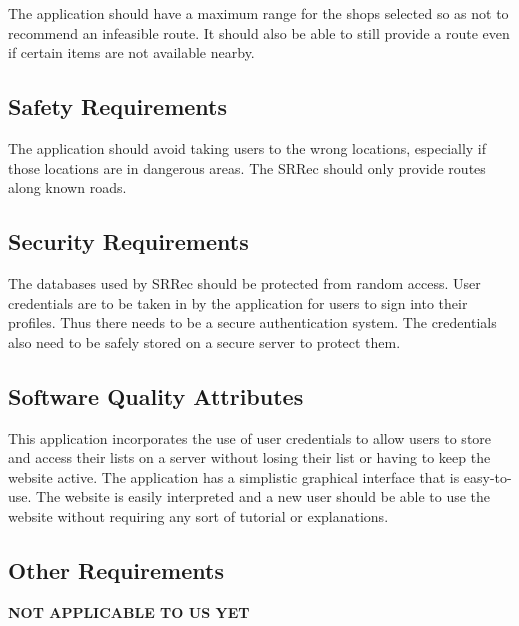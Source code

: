 \documentclass[10pt, a4paper, twocolumn]{scrartcl}
\begin{document}
			The application should have a maximum range for the shops selected so as not to recommend an infeasible route. It should also be able to still provide a route even if certain items are not available nearby.
	
		\subsection{Safety Requirements}
	
			The application should avoid taking users to the wrong locations, especially if those locations are in dangerous areas. The SRRec should only provide routes along known roads.
	
		\subsection{Security Requirements}
	
			The databases used by SRRec should be protected from random access. User credentials are to be taken in by the application for users to sign into their profiles. Thus there needs to be a secure authentication system. The credentials also need to be safely stored on a secure server to protect them.
	
		\subsection{Software Quality Attributes}
	
			This application incorporates the use of user credentials to allow users to store and access their lists on a 	server without losing their list or having to keep the website active. The application has a simplistic graphical interface that is easy-to-use. The website is easily interpreted and a new user should be able to use the website without requiring any sort of tutorial or explanations.
	
		\subsection{Other Requirements}
	
			\textbf{NOT APPLICABLE TO US YET}
	
\end{document}
